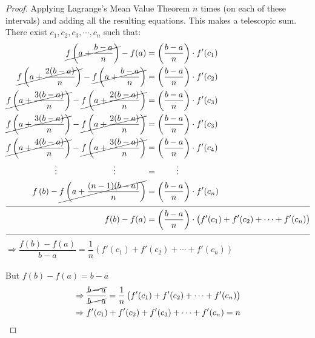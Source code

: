 \documentclass[14]{article}
\theoremstyle{definition}
\begin{document}
\begin{proof}
Applying Lagrange's Mean Value Theorem $n$ times (on each of these intervals) and adding all the resulting equations. This makes a telescopic sum. There exist $c_1, c_2, c_3, \cdots, c_n$ such that:
\begin{align*}
\cancel{f\left(a + \dfrac{b - a}{n}\right)} - f(a) &= \left(\dfrac{b - a}{n}\right) \cdot f'(c_1)\\
\cancel{f\left(a + \dfrac{2(b - a)}{n}\right)} - \cancel{f\left(a + \dfrac{b - a}{n}\right)} &= \left(\dfrac{b - a}{n}\right) \cdot f'(c_2)\\
\cancel{f\left(a + \dfrac{3(b - a)}{n}\right)} - \cancel{f\left(a + \dfrac{2(b - a)}{n}\right)} &= \left(\dfrac{b - a}{n}\right) \cdot f'(c_3)\\
\cancel{f\left(a + \dfrac{3(b - a)}{n}\right)} - \cancel{f\left(a + \dfrac{2(b - a)}{n}\right)} &= \left(\dfrac{b - a}{n}\right) \cdot f'(c_3)\\
\cancel{f\left(a + \dfrac{4(b - a)}{n}\right)} - \cancel{f\left(a + \dfrac{3(b - a)}{n}\right)} &= \left(\dfrac{b - a}{n}\right) \cdot f'(c_4)\\
\vdots\;\;\;\;\;\;\;\;\;\;\;\;\;\;\;\;\;\;\;\;\;\;\;\;\vdots\;\;\;\;\;\;\;\;\;\;\;\;\;&= \;\;\;\;\;\;\;\;\vdots\\
f\left(b \right) - \cancel{f\left(a + \dfrac{(n-1)(b - a)}{n}\right)} &= \left(\dfrac{b - a}{n}\right) \cdot f'(c_n)\\
\cline{0-1}
f(b) - f(a) &= \left(\dfrac{b-a}{n}\right)\cdot \left(f'(c_1) + f'(c_2) + \cdots + f'(c_n)\right)\\
\cline{0-1}
\end{align*}
$\Rightarrow \dfrac{f(b) - f(a)}{b - a} =\dfrac1{n} \left(f'(c_1) + f'(c_2) + \cdots + f'(c_n)\right)$\\\\
But $f(b) - f(a) = b - a$
\begin{align*}
\Rightarrow \dfrac{\cancel{b - a}}{\cancel{b - a}} =\dfrac1{n} \left(f'(c_1) + f'(c_2) + \cdots + f'(c_n)\right)\\
\Rightarrow f'(c_1) + f'(c_2) + f'(c_3) + \cdots + f'(c_n) = n
\end{align*}
\end{proof}
\pagebreak
\end{document}
